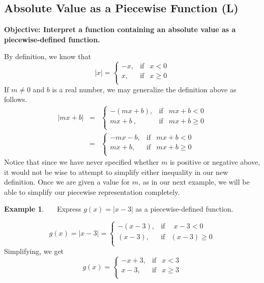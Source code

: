 \documentclass[12pt]{book}
\theoremstyle{definition}
\newtheorem{example}{Example}
\begin{document}
\subsection{Absolute Value as a Piecewise Function (L)}
{\bf Objective: Interpret a function containing an absolute value as a piecewise-defined function.}\par
By definition, we know that \[ |x| =  \left\{ \begin{array}{rcl} -x, & \mbox{if} & x < 0  \\ x, & \mbox{if} & x \geq 0 \\ \end{array} \right.\] 
If $m\neq 0$ and $b$ is a real number, we may generalize the definition above as follows.
\begin{eqnarray*}
|mx+b| &=&  \left\{ \begin{array}{rcl} -(mx+b), & \mbox{if} & mx+b < 0  \\ mx+b~, & \mbox{if} & mx+b \geq 0 \\ \end{array} \right.\\
&=&\left\{ \begin{array}{rcl} -mx-b, & \mbox{if} & mx+b < 0  \\ mx+b, & \mbox{if} & mx+b \geq 0 \\ \end{array} \right.
\end{eqnarray*}
Notice that since we have never specified whether $m$ is positive or negative above, it would not be wise to attempt to simplify either inequality in our new definition.  Once we are given a value for $m$, as in our next example, we will be able to simplify our piecewise representation completely.\par
\begin{example}~~~Express $g(x) = |x-3|$ as a piecewise-defined function.\par
\[ g(x) = |x-3| =  \left\{ \begin{array}{rcl} -(x-3), & \mbox{if} & ~~x-3 < 0  \\ (x-3), & \mbox{if} & (x -3) \geq 0 \\ \end{array} \right.\]
Simplifying, we get
\[ g(x) =\left\{ \begin{array}{rcl} -x+3, & \mbox{if} & x<3  \\ x-3, & \mbox{if} & x \geq 3 \\ \end{array} \right.\]
\end{example}
\end{document}
